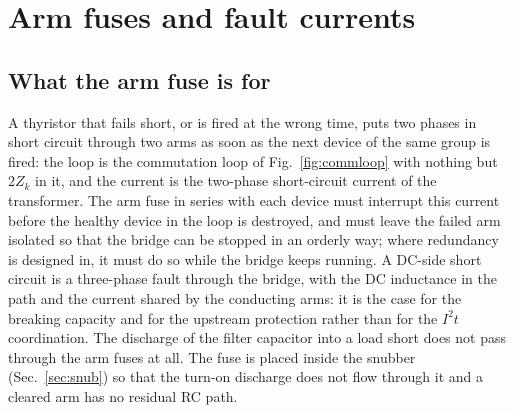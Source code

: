 \documentclass[10pt,a4paper]{scrartcl}
\newcommand{\iit}{I^{2}t}
\begin{document}
\section{Arm fuses and fault currents}\label{sec:fuse}
\subsection{What the arm fuse is for}
A thyristor that fails short, or is fired at the wrong time, puts two phases in short circuit through two arms as soon as the next device of the same group is fired: the loop is the commutation loop of Fig.~\ref{fig:commloop} with nothing but $2Z_k$ in it, and the current is the two-phase short-circuit current of the transformer. The arm fuse in series with each device must interrupt this current before the healthy device in the loop is destroyed, and must leave the failed arm isolated so that the bridge can be stopped in an orderly way; where redundancy is designed in, it must do so while the bridge keeps running. A DC-side short circuit is a three-phase fault through the bridge, with the DC inductance in the path and the current shared by the conducting arms: it is the case for the breaking capacity and for the upstream protection rather than for the $\iit$ coordination. The discharge of the filter capacitor into a load short does not pass through the arm fuses at all. The fuse is placed inside the snubber (Sec.~\ref{sec:snub}) so that the turn-on discharge does not flow through it and a cleared arm has no residual RC path.
\end{document}
